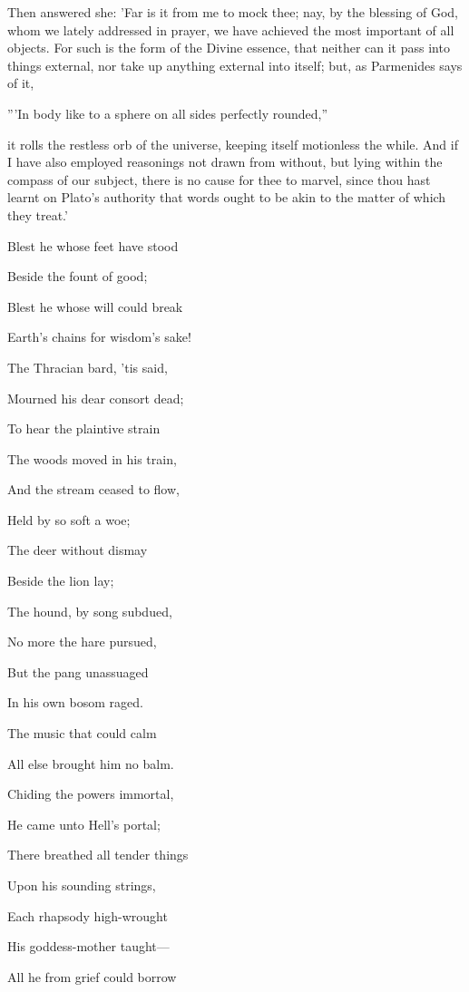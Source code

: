 Then answered she: 'Far is it from me to mock thee; nay, by the blessing
of God, whom we lately addressed in prayer, we have achieved the most
important of all objects. For such is the form of the Divine essence,
that neither can it pass into things external, nor take up anything
external into itself; but, as Parmenides says of it,

'''In body like to a sphere on all sides perfectly rounded,''

it rolls the restless orb of the universe, keeping itself motionless the
while. And if I have also employed reasonings not drawn from without,
but lying within the compass of our subject, there is no cause for thee
to marvel, since thou hast learnt on Plato's authority that words ought
to be akin to the matter of which they treat.'


Blest he whose feet have stood

Beside the fount of good;

Blest he whose will could break

Earth's chains for wisdom's sake!

The Thracian bard, 'tis said,

Mourned his dear consort dead;

To hear the plaintive strain

The woods moved in his train,

And the stream ceased to flow,

Held by so soft a woe;

The deer without dismay

Beside the lion lay;

The hound, by song subdued,

No more the hare pursued,

But the pang unassuaged

In his own bosom raged.

The music that could calm

All else brought him no balm.

Chiding the powers immortal,

He came unto Hell's portal;

There breathed all tender things

Upon his sounding strings,

Each rhapsody high-wrought

His goddess-mother taught—

All he from grief could borrow

